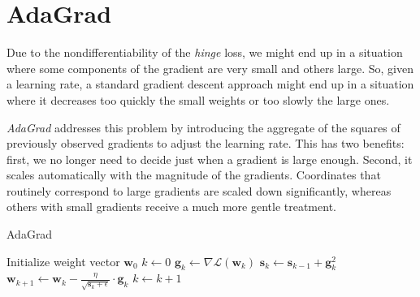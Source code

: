 \section{AdaGrad}

Due to the nondifferentiability of the \emph{hinge} loss, we might end up in a situation where some components of the gradient are very small and others large. So, given a learning rate, a standard gradient descent approach might end up in a situation where it decreases too quickly the small weights or too slowly the large ones.

\emph{AdaGrad} \cite{duchi2011adaptive} addresses this problem by introducing the aggregate of the squares of previously observed gradients to adjust the learning rate. This has two benefits: first, we no longer need to decide just when a gradient is large enough. Second, it scales automatically with the magnitude of the gradients. Coordinates that routinely correspond to large gradients are scaled down significantly, whereas others with small gradients receive a much more gentle treatment.

\begin{algorithm}[h!]
	\caption{AdaGrad}
	\label{alg:adagrad}
	\begin{algorithmic}
			\State Initialize weight vector $\textbf{w}_0$
			\State $k \gets 0$
				\State $\textbf{g}_k \gets \nabla \mathcal{L}(\textbf{w}_k)$
				\State $\textbf{s}_k \gets \textbf{s}_{k-1} + \textbf{g}_k^2$
				\State $\textbf{w}_{k+1} \gets \textbf{w}_k - \displaystyle \frac{\eta}{\sqrt{\textbf{s}_k + \epsilon}} \cdot \textbf{g}_k$
				\State $k \gets k + 1$
			\EndWhile
		\EndProcedure
	\end{algorithmic}
\end{algorithm}
